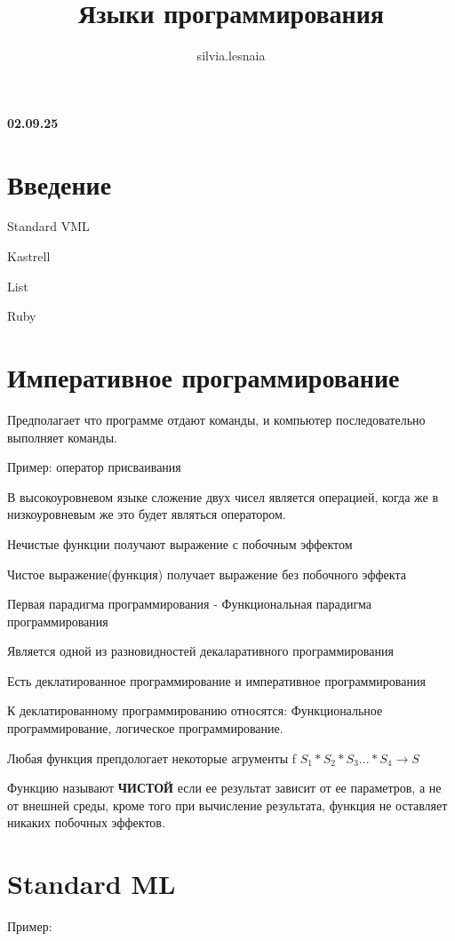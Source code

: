 \documentclass{article}
\title{Языки программирования}
\author{silvia.lesnaia }
\begin{document}
\maketitle

\textbf{02.09.25}

\section{Введение}

Standard VML

Kastrell

List

Ruby

\section{Императивное программирование}

Предполагает что программе отдают команды, и компьютер последовательно
выполняет команды.

Пример: оператор присваивания


В высокоуровневом языке сложение двух чисел является операцией, когда же в низкоуровневым
же это будет являться оператором.


Нечистые функции получают выражение с побочным эффектом

Чистое выражение(функция) получает выражение без побочного эффекта


Первая парадигма программирования - Функциональная парадигма программирования

Является одной из разновидностей декаларативного программирования

Есть деклатированное программирование и императивное программирования

К деклатированному программированию относятся: Функциональное программирование,
логическое программирование.

Любая функция препдологает некоторые агрументы f $S_1*S_2*S_3...*S_4\rightarrow S$

Функцию называют \textbf{ЧИСТОЙ} если ее результат зависит от ее параметров, а не от 
внешней среды, кроме того при вычисление результата, функция не оставляет 
никаких побочных эффектов.

\section{Standard ML}

Пример: 
\end{document}
